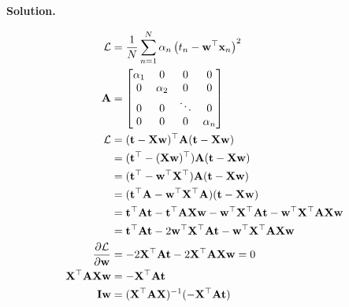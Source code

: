 \documentclass[10pt]{article}
\begin{document}
\begin{itemize}
{\bf Solution.} 

\begin{eqnarray*}
\begin{aligned}
\mathcal{L} &= {1 \over N} \sum_{n=1}^N \alpha_n \left( t_n - \mathbf{w}^\top \mathbf{x}_n \right)^2
\\
\mathbf{A} &= 
	\begin{bmatrix}
	\alpha_{1} & 0 & 0 & 0
	\\
	0 & \alpha_{2} & 0 & 0
	\\
	0 & 0 & \ddots & 0
	\\
	0 & 0 & 0 & \alpha_{n}
	\end{bmatrix}
\\
\mathcal{L} &= (\mathbf{t} - \mathbf{X} \mathbf{w})^\top \mathbf{A} (\mathbf{t} - \mathbf{X} \mathbf{w})
\\
&= (\mathbf{t}^\top - (\mathbf{X} \mathbf{w})^\top) \mathbf{A} (\mathbf{t} - \mathbf{X} \mathbf{w})
\\
&= ( \mathbf{t}^\top - \mathbf{w}^\top \mathbf{X}^\top ) \mathbf{A} (\mathbf{t} - \mathbf{X} \mathbf{w})
\\
&= ( \mathbf{t}^\top \mathbf{A} - \mathbf{w}^\top \mathbf{X}^\top \mathbf{A}) (\mathbf{t} - \mathbf{X} \mathbf{w})
\\
&= \mathbf{t}^\top \mathbf{A} \mathbf{t} 
  - \mathbf{t}^\top \mathbf{A} \mathbf{X} \mathbf{w} 
  - \mathbf{w}^\top \mathbf{X}^\top \mathbf{A} \mathbf{t}
  - \mathbf{w}^\top \mathbf{X}^\top \mathbf{A} \mathbf{X} \mathbf{w}
\\
&= \mathbf{t}^\top \mathbf{A} \mathbf{t} 
  - 2 \mathbf{w}^\top \mathbf{X}^\top \mathbf{A} \mathbf{t}
  - \mathbf{w}^\top \mathbf{X}^\top \mathbf{A} \mathbf{X} \mathbf{w}
\\
\frac { \partial \mathcal{L}} {\partial \mathbf{w}} 
  &= - 2 \mathbf{X}^\top \mathbf{A} \mathbf{t} 
  - 2 \mathbf{X}^\top \mathbf{A} \mathbf{X} \mathbf{w} = 0
\\
\mathbf{X}^\top \mathbf{A} \mathbf{X} \mathbf{w}
  &= - \mathbf{X}^\top \mathbf{A} \mathbf{t} 
\\
\mathbf{I} \mathbf{w} &= (\mathbf{X}^\top \mathbf{A} \mathbf{X})^{-1} (- \mathbf{X}^\top \mathbf{A} \mathbf{t})
\end{aligned}
\end{eqnarray*}

\end{itemize}
\end{document}
